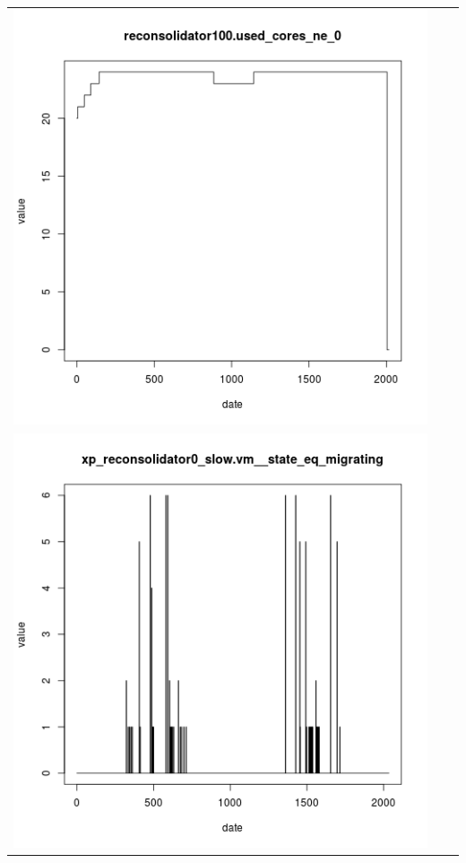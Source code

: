 \documentclass{beamer}
\begin{document}
\begin{frame}
\begin{tabular}{ccc}
\includegraphics[scale=0.22]{reconsolidator100_used_cores_ne_0}\\
\includegraphics[scale=0.22]{xp_reconsolidator0_slow_vm__state_eq_migrating}&

\end{tabular}
\end{frame}
\end{document}
